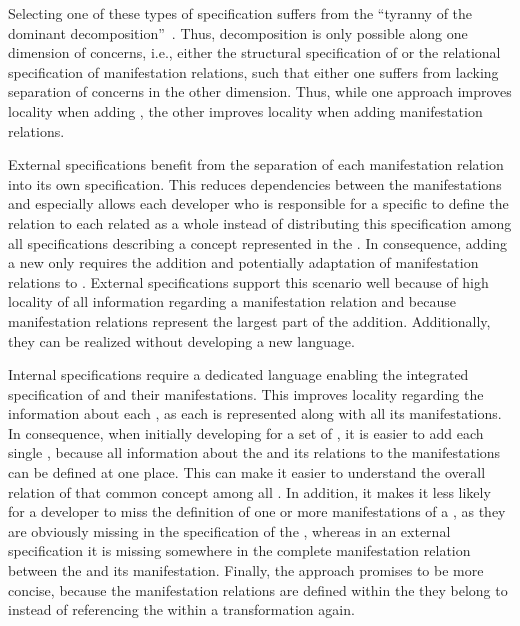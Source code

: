 Selecting one of these types of specification suffers from the \enquote{tyranny of the dominant decomposition}~\cite{tarr1999Tyranny-ICSE}.
Thus, decomposition is only possible along one dimension of concerns, i.e., either the structural specification of \commonalities or the relational specification of manifestation relations, such that either one suffers from lacking separation of concerns in the other dimension.
Thus, while one approach improves locality when adding \commonalities, the other improves locality when adding manifestation relations.

External specifications benefit from the separation of each manifestation relation into its own specification.
This reduces dependencies between the manifestations and especially allows each developer who is responsible for a specific \concretemetamodel to define the relation to each related \conceptmetamodel as a whole instead of distributing this specification among all \commonalities specifications describing a concept represented in the \concretemetamodel.
In consequence, adding a new \concretemetamodel only requires the addition and potentially adaptation of manifestation relations to \conceptmetamodels.
External specifications support this scenario well because of high locality of all information regarding a manifestation relation and because manifestation relations represent the largest part of the addition.
Additionally, they can be realized without developing a new language.

Internal specifications require a dedicated language enabling the integrated specification of \commonalities and their manifestations.
This improves locality regarding the information about each \commonality, as each \commonality is represented along with all its manifestations.
In consequence, when initially developing \commonalities for a set of \concretemetamodels, it is easier to add each single \commonality, because all information about the \commonality and its relations to the manifestations can be defined at one place.
This can make it easier to understand the overall relation of that common concept among all \concretemetamodels.
In addition, it makes it less likely for a developer to miss the definition of one or more manifestations of a \commonality, as they are obviously missing in the specification of the \commonality, whereas in an external specification it is missing somewhere in the complete manifestation relation between the \conceptmetamodel and its manifestation.
Finally, the approach promises to be more concise, because the manifestation relations are defined within the \commonality they belong to instead of referencing the \commonality within a transformation again.

